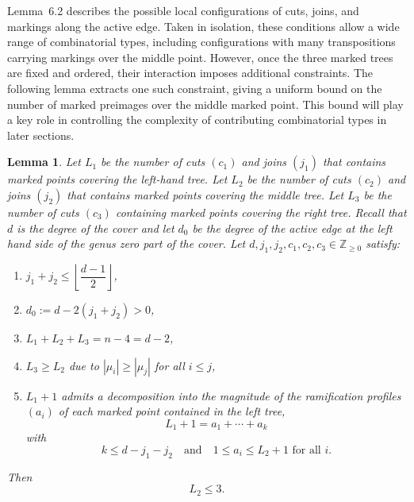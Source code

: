 \documentclass[11pt,reqno]{amsart}
\newtheorem{lemma}[theorem]{Lemma}
\theoremstyle{definition}
\begin{document}
Lemma~6.2 describes the possible local configurations of cuts, joins, and markings along
the active edge. Taken in isolation, these conditions allow a wide range of combinatorial
types, including configurations with many transpositions carrying markings over the middle
point. However, once the three marked trees are fixed and ordered,
their interaction imposes additional constraints. The following lemma extracts one such constraint, giving a uniform
bound on the number of marked preimages over the middle marked point. This bound will play a key role in controlling the complexity of contributing combinatorial types in later sections.

\begin{lemma}\label{lemma:max3cutsandjoins}
Let $L_1$ be the number of cuts $(c_1)$ and joins $(j_1)$ that contains marked points covering the left-hand tree. Let $L_2$ be the number of cuts $(c_2)$ and joins $(j_2)$ that contains marked points covering the middle tree. Let $L_3$ be the number of cuts $(c_3)$ containing marked points covering the right tree. Recall that $d$ is the degree of the cover and let $d_0$ be the degree of the active edge at the left hand side of the genus zero part of the cover. 
Let $d,j_1,j_2,c_1,c_2,c_3 \in \mathbb{Z}_{\ge 0}$ satisfy:
\begin{enumerate}
  \item $j_1+j_2 \le \left\lfloor \dfrac{d-1}{2}\right\rfloor$,
  \item $d_0 := d-2(j_1+j_2) > 0$,
  \item $L_1 + L_2 + L_3 = n-4=d-2$, 
  \item $L_3 \ge L_2$ due to $|\mu_i|\geq|\mu_j|$ for all $i\leq j$,
  \item $L_1+1$ admits a decomposition into the magnitude of the ramification profiles $(a_i)$ of each marked point contained in the left tree,
  \[
  L_1 + 1 = a_1 + \cdots + a_k
  \]
  with
  \[
  k \le d-j_1-j_2
  \quad\text{and}\quad
  1 \le a_i \le L_2+1 \text{ for all } i.
  \] 
\end{enumerate}
Then
\[
L_2 \le 3.
\]
\end{lemma}
\end{document}
